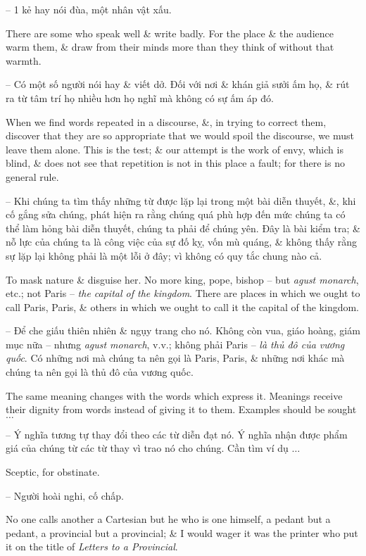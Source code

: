 \documentclass{article}
\begin{document}
\begin{enumerate}
\begin{itemize}
		-- 1 kẻ hay nói đùa, một nhân vật xấu.
		
		 There are some who speak well \& write badly. For the place \& the audience warm them, \& draw from their minds more than they think of without that warmth.
		
		-- Có một số người nói hay \& viết dở. Đối với nơi \& khán giả sưởi ấm họ, \& rút ra từ tâm trí họ nhiều hơn họ nghĩ mà không có sự ấm áp đó.
		
		 When we find words repeated in a discourse, \&, in trying to correct them, discover that they are so appropriate that we would spoil the discourse, we must leave them alone. This is the test; \& our attempt is the work of envy, which is blind, \& does not see that repetition is not in this place a fault; for there is no general rule.
		
		-- Khi chúng ta tìm thấy những từ được lặp lại trong một bài diễn thuyết, \&, khi cố gắng sửa chúng, phát hiện ra rằng chúng quá phù hợp đến mức chúng ta có thể làm hỏng bài diễn thuyết, chúng ta phải để chúng yên. Đây là bài kiểm tra; \& nỗ lực của chúng ta là công việc của sự đố kỵ, vốn mù quáng, \& không thấy rằng sự lặp lại không phải là một lỗi ở đây; vì không có quy tắc chung nào cả.
		
		 To mask nature \& disguise her. No more king, pope, bishop -- but {\it agust monarch}, etc.; not Paris -- {\it the capital of the kingdom}. There are places in which we ought to call Paris, Paris, \& others in which we ought to call it the capital of the kingdom.
		
		-- Để che giấu thiên nhiên \& ngụy trang cho nó. Không còn vua, giáo hoàng, giám mục nữa -- nhưng {\it agust monarch}, v.v.; không phải Paris -- {\it là thủ đô của vương quốc}. Có những nơi mà chúng ta nên gọi là Paris, Paris, \& những nơi khác mà chúng ta nên gọi là thủ đô của vương quốc.
		
		 The same meaning changes with the words which express it. Meanings receive their dignity from words instead of giving it to them. Examples should be sought $\ldots$
		
		-- Ý nghĩa tương tự thay đổi theo các từ diễn đạt nó. Ý nghĩa nhận được phẩm giá của chúng từ các từ thay vì trao nó cho chúng. Cần tìm ví dụ $\ldots$
		
		 Sceptic, for obstinate.
		
		-- Người hoài nghi, cố chấp.
		
		 No one calls another a Cartesian but he who is one himself, a pedant but a pedant, a provincial but a provincial; \& I would wager it was the printer who put it on the title of {\it Letters to a Provincial}.
		

\end{itemize}
\end{enumerate}
\end{document}
